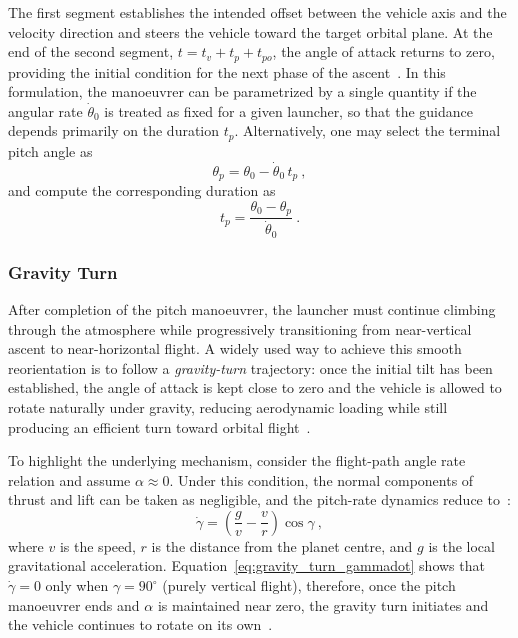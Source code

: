 The first segment establishes the intended offset between the vehicle axis and the velocity direction and steers the vehicle toward the target orbital plane. At the end of the second segment, $t=t_v+t_p+t_{po}$, the angle of attack returns to zero, providing the initial condition for the next phase of the ascent~\cite{teofilatto2025trajectories}.
In this formulation, the manoeuvrer can be parametrized by a single quantity if the angular rate $\dot{\theta}_0$ is treated as fixed for a given launcher, so that the guidance depends primarily on the duration $t_p$. Alternatively, one may select the terminal pitch angle as~\cite{teofilatto2025trajectories}
\begin{equation}
\theta_p = \theta_0-\dot{\theta}_0\,t_p \ ,
\end{equation}
and compute the corresponding duration as
\begin{equation}
t_p=\frac{\theta_0-\theta_p}{\dot{\theta}_0} \ .
\end{equation}


\subsubsection{Gravity Turn}

After completion of the pitch manoeuvrer, the launcher must continue climbing through the atmosphere while progressively transitioning from near-vertical ascent to near-horizontal flight. A widely used way to achieve this smooth reorientation is to follow a \emph{gravity-turn} trajectory: once the initial tilt has been established, the angle of attack is kept close to zero and the vehicle is allowed to rotate naturally under gravity, reducing aerodynamic loading while still producing an efficient turn toward orbital flight~\cite{Ulrich, teofilatto2025trajectories}.

To highlight the underlying mechanism, consider the flight-path angle rate relation and assume $\alpha \approx 0$. Under this condition, the normal components of thrust and lift can be taken as negligible, and the pitch-rate dynamics reduce to~\cite{Ulrich}:
\begin{equation}
\dot{\gamma}=\left(\frac{g}{v}-\frac{v}{r}\right)\cos\gamma \ ,
\label{eq:gravity_turn_gammadot}
\end{equation}
where $v$ is the speed, $r$ is the distance from the planet centre, and $g$ is the local gravitational acceleration.
Equation~\eqref{eq:gravity_turn_gammadot} shows that $\dot{\gamma}=0$ only when $\gamma=90^\circ$ (purely vertical flight), therefore, once the pitch manoeuvrer ends and $\alpha$ is maintained near zero, the gravity turn initiates and the vehicle continues to rotate on its own~\cite{Ulrich}.

